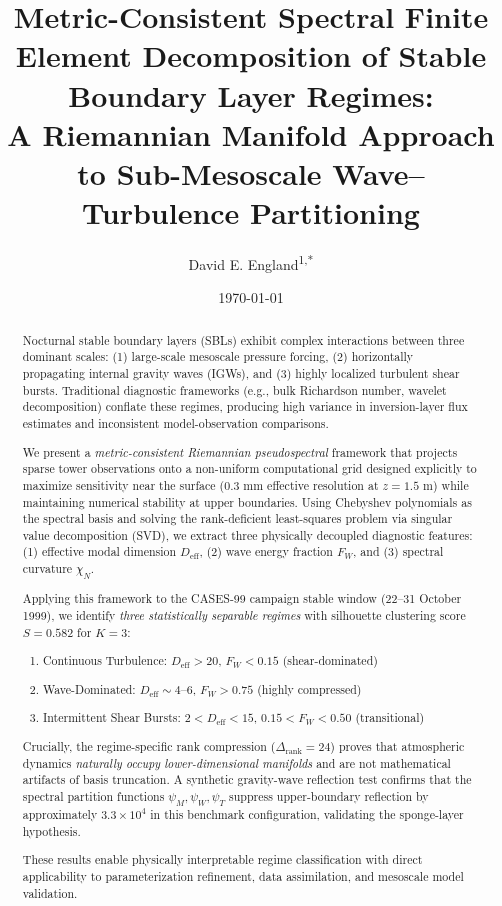 \documentclass[11pt,a4paper]{article}
\title{Metric-Consistent Spectral Finite Element Decomposition of Stable Boundary Layer Regimes: \\
A Riemannian Manifold Approach to Sub-Mesoscale Wave--Turbulence Partitioning}
\author{David E. England\textsuperscript{1,*}}
\affil{\textsuperscript{1}The University of Alabama in Huntsville, 301 Sparkman Drive Huntsville, AL 35899, USA}
\affil{\textsuperscript{*}Corresponding author: David.England@UAH.Edu}
\date{\today}
\begin{document}
\maketitle

\begin{abstract}
Nocturnal stable boundary layers (SBLs) exhibit complex interactions between three dominant scales: (1) large-scale mesoscale pressure forcing, (2) horizontally propagating internal gravity waves (IGWs), and (3) highly localized turbulent shear bursts. Traditional diagnostic frameworks (e.g., bulk Richardson number, wavelet decomposition) conflate these regimes, producing high variance in inversion-layer flux estimates and inconsistent model-observation comparisons.

We present a \emph{metric-consistent Riemannian pseudospectral} framework that projects sparse tower observations onto a non-uniform computational grid designed explicitly to maximize sensitivity near the surface (0.3 mm effective resolution at $z = 1.5$ m) while maintaining numerical stability at upper boundaries. Using Chebyshev polynomials as the spectral basis and solving the rank-deficient least-squares problem via singular value decomposition (SVD), we extract three physically decoupled diagnostic features: (1) effective modal dimension $D_{\mathrm{eff}}$, (2) wave energy fraction $F_W$, and (3) spectral curvature $\chi_N$.

Applying this framework to the CASES-99 campaign stable window (22--31 October 1999), we identify \emph{three statistically separable regimes} with silhouette clustering score $S = 0.582$ for $K=3$:
\begin{enumerate}
  \item Continuous Turbulence: $D_{\mathrm{eff}} > 20$, $F_W < 0.15$ (shear-dominated)
  \item Wave-Dominated: $D_{\mathrm{eff}} \sim 4$--$6$, $F_W > 0.75$ (highly compressed)
  \item Intermittent Shear Bursts: $2 < D_{\mathrm{eff}} < 15$, $0.15 < F_W < 0.50$ (transitional)
\end{enumerate}

Crucially, the regime-specific rank compression ($\Delta_{\mathrm{rank}} = 24$) proves that atmospheric dynamics \emph{naturally occupy lower-dimensional manifolds} and are not mathematical artifacts of basis truncation. A synthetic gravity-wave reflection test confirms that the spectral partition functions $\psi_M, \psi_W, \psi_T$ suppress upper-boundary reflection by approximately $3.3\times 10^4$ in this benchmark configuration, validating the sponge-layer hypothesis.

These results enable physically interpretable regime classification with direct applicability to parameterization refinement, data assimilation, and mesoscale model validation.
\end{abstract}
\end{document}
